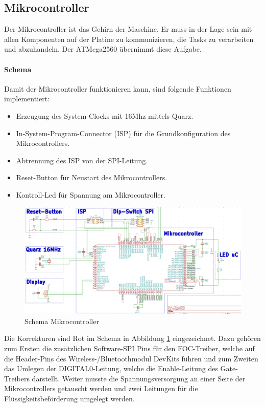 \subsection{Mikrocontroller}
\label{subsec:Mikrocontroller}

Der Mikrocontroller ist das Gehirn der Maschine. Er muss in der Lage sein mit allen Komponenten auf der Platine zu kommunizieren, die Tasks zu verarbeiten und abzuhandeln. Der ATMega2560 übernimmt diese Aufgabe.


\paragraph{Schema}\mbox{}

Damit der Mikrocontroller funktionieren kann, sind folgende Funktionen implementiert:
\begin{itemize}
\item Erzeugung des System-Clocks mit 16Mhz mittels Quarz.
\item In-System-Program-Connector (ISP) für die Grundkonfiguration des Mikrocontrollers.
\item Abtrennung des ISP von der SPI-Leitung.
\item Reset-Button für Neustart des Mikrocontrollers.
\item Kontroll-Led für Spannung am Mikrocontroller.
\end{itemize}

\begin{figure}[H]
\center
\includegraphics[width = \textwidth]{graphics/Schema_uC}
\caption{Schema Mikrocontroller}
\label{fig:Schema_uC}
\end{figure}

Die Korrekturen sind Rot im Schema in Abbildung \ref{fig:Schema_uC} eingezeichnet. Dazu gehören zum Ersten die zusätzlichen Software-SPI Pins für den FOC-Treiber, welche auf die Header-Pins des Wireless-/Bluetoothmodul DevKits führen und zum Zweiten das Umlegen der DIGITAL0-Leitung, welche die Enable-Leitung des Gate-Treibers darstellt. Weiter musste die Spannungsversorgung an einer Seite der Mikrocontrollers getauscht werden und zwei Leitungen für die Flüssigkeitsbeförderung umgelegt werden.

